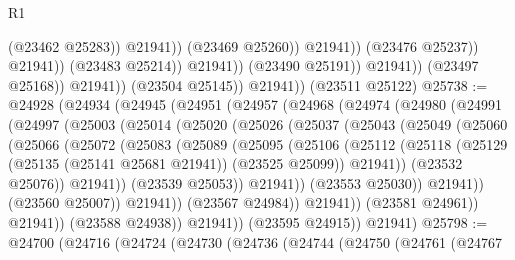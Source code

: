 \begin{lexlean}{R1}
\begin{coremodule}
                                              (@23462 @25283))
                                            @21941))
                                        (@23469 @25260))
                                      @21941))
                                  (@23476 @25237))
                                @21941))
                            (@23483 @25214))
                          @21941))
                      (@23490 @25191))
                    @21941))
                (@23497 @25168))
              @21941))
          (@23504 @25145))
        @21941))
    (@23511 @25122)
@25738 := @24928
    (@24934
      (@24945
        (@24951
          (@24957
            (@24968
              (@24974
                (@24980
                  (@24991
                    (@24997
                      (@25003
                        (@25014
                          (@25020
                            (@25026
                              (@25037
                                (@25043
                                  (@25049
                                    (@25060
                                      (@25066
                                        (@25072
                                          (@25083
                                            (@25089
                                              (@25095
                                                (@25106
                                                  (@25112
                                                    (@25118
                                                      (@25129
                                                        (@25135 (@25141 @25681 @21941))
                                                        (@23525 @25099))
                                                      @21941))
                                                  (@23532 @25076))
                                                @21941))
                                            (@23539 @25053))
                                          @21941))
                                      (@23553 @25030))
                                    @21941))
                                (@23560 @25007))
                              @21941))
                          (@23567 @24984))
                        @21941))
                    (@23581 @24961))
                  @21941))
              (@23588 @24938))
            @21941))
        (@23595 @24915))
      @21941)
@25798 := @24700
    (@24716
      (@24724
        (@24730
          (@24736
            (@24744
              (@24750
                (@24761
                  (@24767

\end{coremodule}
\end{lexlean}
